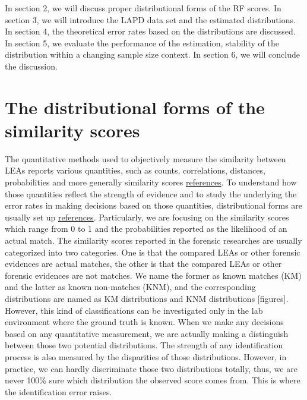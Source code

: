 \documentclass[]{elsarticle} %
\begin{document}
In section 2, we will discuss proper distributional forms of the RF
scores. In section 3, we will introduce the LAPD data set and the
estimated distributions. In section 4, the theoretical error rates based
on the distributions are discussed. In section 5, we evaluate the
performance of the estimation, stability of the distribution within a
changing sample size context. In section 6, we will conclude the
discussion.

\hypertarget{the-distributional-forms-of-the-similarity-scores}{%
\section{The distributional forms of the similarity
scores}\label{the-distributional-forms-of-the-similarity-scores}}

The quantitative methods used to objectively measure the similarity
between LEAs reports various quantities, such as counts, correlations,
distances, probabilities and more generally similarity scores
\protect\hyperlink{references}{references}. To understand how those
quantities reflect the strength of evidence and to study the underlying
the error rates in making decisions based on those quantities,
distributional forms are usually set up
\protect\hyperlink{references}{references}. Particularly, we are
focusing on the similarity scores which range from 0 to 1 and the
probabilities reported as the likelihood of an actual match. The
similarity scores reported in the forensic researches are usually
categorized into two categories. One is that the compared LEAs or other
forensic evidences are actual matches, the other is that the compared
LEAs or other forensic evidences are not matches. We name the former as
known matches (KM) and the latter as known non-matches (KNM), and the
corresponding distributions are named as KM distributions and KNM
distributions {[}figures{]}. However, this kind of classifications can
be investigated only in the lab environment where the ground truth is
known. When we make any decisions based on any quantitative measurement,
we are actually making a distinguish between those two potential
distributions. The strength of any identification process is also
measured by the disparities of those distributions. However, in
practice, we can hardly discriminate those two distributions totally,
thus, we are never 100\% sure which distribution the observed score
comes from. This is where the identification error raises.
\end{document}
